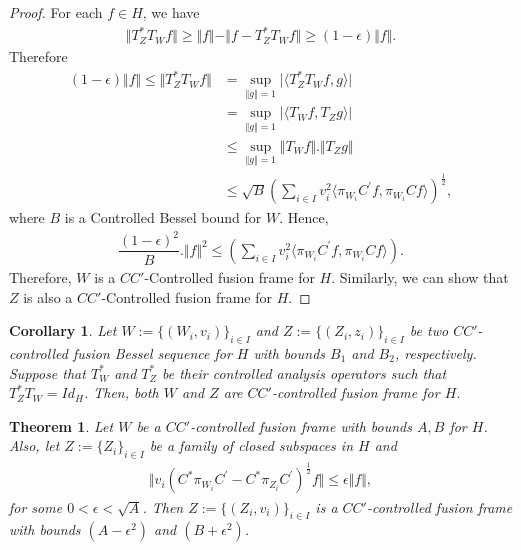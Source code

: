 \documentclass{mfatshort}
\newtheorem{theorem}{Theorem}[section]
\newtheorem{corollary}{Corollary}
\begin{document}
\begin{proof}
For each $f\in H$, we have 
\begin{align*}
\Vert T^{*}_{Z}T_ {W}f\Vert\geq\Vert f\Vert-\Vert f-T^{*}_{Z}T_ {W} f \Vert\geq (1- \epsilon)\Vert f \Vert.
\end{align*}
Therefore
\begin{align*}
(1- \epsilon)\Vert f \Vert\leq\Vert T^{*}_{Z}T_ {W}f\Vert &=\sup _ {\Vert g\Vert =1}\vert \langle T^{*}_{Z}T_ {W}f,g \rangle\vert\\
&=\sup _ {\Vert g\Vert =1}\vert \langle T_ {W}f,T_{Z}g \rangle\vert\\
&\leq \sup _ {\Vert g\Vert =1} \Vert T_ {W}f\Vert .\Vert T_{Z}g\Vert\\
&\leq \sqrt{B}(\sum _{i\in I} v_{i}^{2} \langle \pi_{W_{i}} C^{\prime}f,\pi_{W_{i}} Cf \rangle)^{\frac{1}{2}},
\end{align*}
where $B$ is a Controlled Bessel bound for $W$. Hence,
\begin{align*}
\dfrac{(1- \epsilon)^{2}}{B}.\Vert f\Vert^{2}\leq(\sum _{i\in I} v_{i}^{2} \langle \pi_{W_{i}} C^{\prime}f,\pi_{W_{i}} Cf \rangle).
\end{align*}
Therefore, $W$ is a $CC'$-Controlled fusion frame for $H$. Similarly, we can show that $Z$ is also a   $CC'$-Controlled fusion frame  for $H$.
\end{proof}
\begin{corollary}
Let $W:=\lbrace(W_{i},v_{i})\rbrace _{i \in I}$ and $Z:=\lbrace(Z_{i},z_{i})\rbrace _{i \in I}$ be two $CC'$-controlled fusion Bessel sequence for $H$ with bounds $B_{1}$ and $B_{2}$, respectively. Suppose that $T^{*}_{W}$ and $T^{*}_{Z}$ be their controlled analysis operators such that $T^{*}_{Z}T_{W}=Id_{H}$. Then, both $W$  and $Z$ are $CC'$-controlled fusion frame  for $H$.\\
\end{corollary}
\begin{theorem}
Let $W$ be a $CC'$-controlled fusion frame with bounds $A,B$ for $H$. Also, let $Z:=\lbrace Z_{i}\rbrace _{i \in I}$ be a family of closed subspaces in $H$ and
\begin{align*}
\Vert v_{i}(C^{*}\pi_{W_{i}} C^{\prime}-C^{*}\pi_{Z_{i}} C^{\prime})^{\frac{1}{2}}f \Vert \leq \epsilon \Vert f\Vert,
\end{align*}
for some $0<\epsilon<\sqrt{A}$. Then $Z:=\lbrace(Z_{i},v_{i})\rbrace _{i \in I}$ is a  $CC'$-controlled fusion frame with bounds $(A-\epsilon^{2})$ and $(B+\epsilon^{2})$.
\end{theorem}
\end{document}
